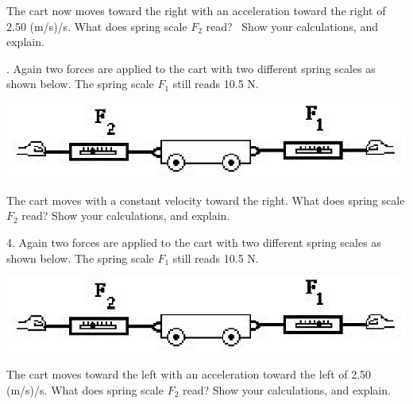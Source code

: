 The cart now moves toward the right with an acceleration toward the right of
2.50 (m/s)/s. What does spring scale \( F_{2} \) read?~ Show your calculations,
and explain.
\answerspace{20mm}

. Again two forces are applied to the cart with two different spring scales
as shown below. The spring scale \( F_{1} \) still reads 10.5 N.

\vspace{0.3cm}
{\par\centering \includegraphics{combining/combining_fig4.eps} \par}
\vspace{0.3cm}

The cart moves with a constant velocity toward the right. What does spring scale
\( F_{2} \) read? Show your calculations, and explain.
\vspace{20mm}

4. Again two forces are applied to the cart with two different spring scales
as shown below. The spring scale \( F_{1} \) still reads 10.5 N.

\vspace{0.3cm}
{\par\centering \includegraphics{combining/combining_fig4.eps} \par}
\vspace{0.3cm}

The cart moves toward the left with an acceleration toward the left of 2.50
(m/s)/s. What does spring scale \( F_{2} \) read? Show your calculations, and
explain.

